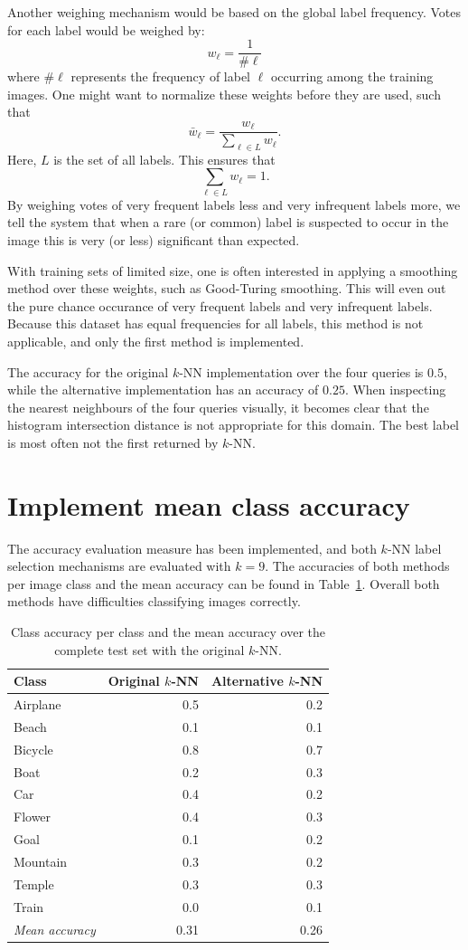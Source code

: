 \documentclass[a4paper,10pt]{article}
\begin{document}
Another weighing mechanism would be based on the global label frequency.  Votes for each label would be weighed by: \[ w_\ell = \frac{1}{\#\ell} \] where $\#\ell$ represents the frequency of label $\ell$ occurring among the training images.  One might want to normalize these weights before they are used, such that \[\bar w_\ell = \frac{w_\ell}{\sum_{\ell \in L} w_\ell}. \] Here, $L$ is the set of all labels.  This ensures that \[\sum_{\ell \in L} w_\ell = 1.\] By weighing votes of very frequent labels less and very infrequent labels more, we tell the system that when a rare (or common) label is suspected to occur in the image this is very (or less) significant than expected.

With training sets of limited size, one is often interested in applying a smoothing method over these weights, such as Good-Turing smoothing.  This will even out the pure chance occurance of very frequent labels and very infrequent labels.  Because this dataset has equal frequencies for all labels, this method is not applicable, and only the first method is implemented.

The accuracy for the original $k$-NN implementation over the four queries is $0.5$, while the alternative implementation has an accuracy of $0.25$.  When inspecting the nearest neighbours of the four queries visually, it becomes clear that the histogram intersection distance is not appropriate for this domain.  The best label is most often not the first returned by $k$-NN.

\section{Implement mean class accuracy}
The accuracy evaluation measure has been implemented, and both $k$-NN label selection mechanisms are evaluated with $k=9$.  The accuracies of both methods per image class and the mean accuracy can be found in Table~\ref{t:classacc}.  Overall both methods have difficulties classifying images correctly.  

\begin{table}
  \centering
  \begin{tabular}{l|rr}
    Class & Original $k$-NN & Alternative $k$-NN \\
    \hline
    Airplane & 0.5 & 0.2 \\
    Beach & 0.1 & 0.1 \\
    Bicycle & 0.8 & 0.7 \\
    Boat & 0.2 & 0.3 \\
    Car & 0.4 & 0.2 \\
    Flower & 0.4 & 0.3 \\
    Goal & 0.1 & 0.2 \\
    Mountain & 0.3 & 0.2 \\
    Temple & 0.3 & 0.3 \\
    Train & 0.0 & 0.1 \\
    \hline
    \emph{Mean accuracy} & 0.31 & 0.26
  \end{tabular}
  \caption{Class accuracy per class and the mean accuracy over the complete test set with the original $k$-NN.}
  \label{t:classacc}
\end{table}
\end{document}
